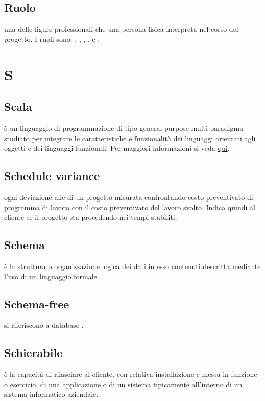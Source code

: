 \documentclass[12pt,a4paper]{article}
\begin{document}
\subsection{Ruolo} 
una delle figure professionali che una persona fisica interpreta nel corso del progetto. I ruoli sono: , , , ,  e .


\newpage

\section{S}


\subsection{Scala} 
è un linguaggio di programmazione di tipo general-purpose multi-paradigma studiato per integrare le caratteristiche e funzionalità dei linguaggi orientati agli oggetti e dei linguaggi funzionali. Per maggiori informazioni si veda \href{https://it.wikipedia.org/wiki/Scala_(linguaggio_di_programmazione)}{qui}.

\subsection{Schedule variance} 
ogni deviazione alle  di un progetto misurata confrontando costo preventivato di programma di lavoro con il costo preventivato del lavoro svolto. Indica quindi al cliente se il progetto sta procedendo nei tempi stabiliti.

\subsection{Schema} 
è la struttura o organizzazione logica dei dati in esso contenuti descritta mediante l'uso di un linguaggio formale.

\subsection{Schema-free} 
si riferiscono a database .

\subsection{Schierabile} 
è la capacità di rilasciare al cliente, con relativa installazione e messa in funzione o esercizio, di una applicazione o di un sistema  tipicamente all'interno di un sistema informatico aziendale.
\end{document}
